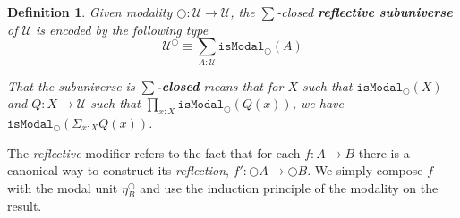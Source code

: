 \documentclass[12pt]{report}
\newtheorem{defn}[thm]{Definition}
\theoremstyle{definition}
\begin{document}
\begin{defn}\label{reflectiveSubuniverse}
Given modality $\bigcirc : \mathcal{U} \rightarrow \mathcal{U}$, the $\sum$-closed \textbf{reflective subuniverse} of $\mathcal{U}$ is encoded by the following type
$$\mathcal{U}^\bigcirc \equiv \sum_{A : \mathcal{U}}\mathtt{isModal}_\bigcirc (A)$$

That the subuniverse is $\sum$\textbf{-closed} means that for $X$ such that $\mathtt{isModal}_{\bigcirc}(X)$ and $Q : X \rightarrow \mathcal{U}$ such that $\prod_{x : X} \mathtt{isModal}_{\bigcirc}(Q(x))$, we have $\mathtt{isModal}_{\bigcirc}(\Sigma_{x : X} Q(x))$.
\end{defn}
The \textit{reflective} modifier refers to the fact that for each $f : A \rightarrow B$ there is a canonical way to construct its \textit{reflection}, $f' : \bigcirc A \rightarrow \bigcirc B$. 
We simply compose $f$ with the modal unit $\eta_B^\bigcirc$ and use the induction principle of the modality on the result. 
\end{document}
